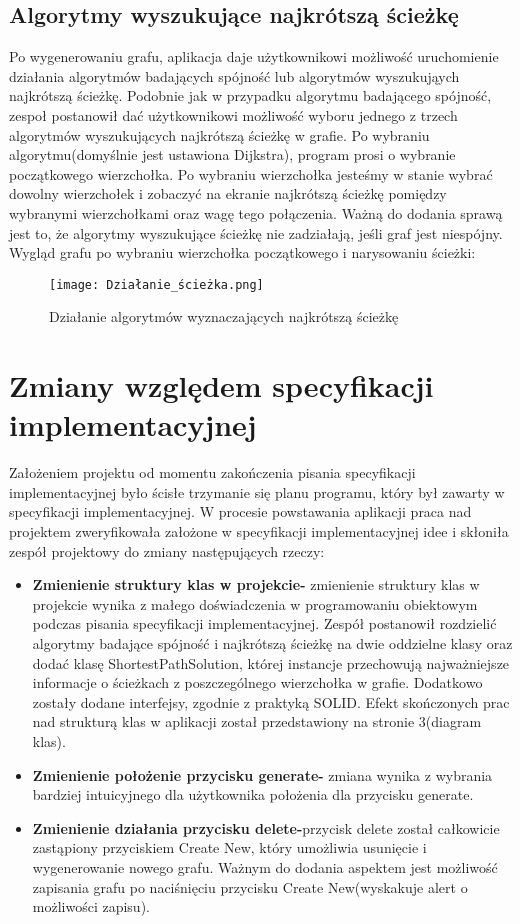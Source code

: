 \documentclass[10pt]{article}
\begin{document}
\subsection{Algorytmy wyszukujące najkrótszą ścieżkę}
Po wygenerowaniu grafu, aplikacja daje użytkownikowi możliwość uruchomienie działania algorytmów badających spójność lub algorytmów wyszukująych najkrótszą ścieżkę. Podobnie jak w przypadku algorytmu badającego spójność, zespoł postanowił dać użytkownikowi możliwość wyboru jednego z  trzech algorytmów wyszukujących najkrótszą ścieżkę w grafie. Po wybraniu algorytmu(domyślnie jest ustawiona Dijkstra), program prosi o wybranie początkowego wierzchołka. Po wybraniu wierzchołka jesteśmy w stanie wybrać dowolny wierzchołek i zobaczyć na ekranie najkrótszą ścieżkę pomiędzy wybranymi wierzchołkami oraz wagę tego połączenia. Ważną do dodania sprawą jest to, że algorytmy wyszukujące ścieżkę nie zadziałają, jeśli graf jest niespójny.\\ Wygląd grafu po wybraniu wierzchołka początkowego i narysowaniu ścieżki:
\begin{figure}[h]
\centering
\texttt{[image: Działanie\_ścieżka.png]}
\caption{Działanie algorytmów wyznaczających najkrótszą ścieżkę}
\end{figure}
\newpage
\section{Zmiany względem specyfikacji implementacyjnej}
Założeniem projektu od momentu zakończenia pisania specyfikacji implementacyjnej było ścisłe trzymanie się planu programu, który był zawarty w specyfikacji implementacyjnej. W procesie powstawania aplikacji praca nad projektem zweryfikowała założone w specyfikacji implementacyjnej idee i skłoniła zespół projektowy do zmiany następujących rzeczy:
\begin{itemize}
    \item \textbf{Zmienienie struktury klas w projekcie-} zmienienie struktury klas w projekcie wynika z małego doświadczenia w programowaniu obiektowym podczas pisania specyfikacji implementacyjnej. Zespół postanowił rozdzielić algorytmy badające spójność i najkrótszą ścieżkę na dwie oddzielne klasy oraz dodać klasę ShortestPathSolution, której instancje przechowują najważniejsze informacje o ścieżkach z poszczególnego wierzchołka w grafie. Dodatkowo zostały dodane interfejsy, zgodnie z praktyką SOLID. Efekt skończonych prac nad strukturą klas w aplikacji został przedstawiony na stronie 3(diagram klas).
    \item \textbf{Zmienienie położenie przycisku generate-} zmiana wynika z wybrania bardziej intuicyjnego dla użytkownika położenia dla przycisku generate.
    \item \textbf{Zmienienie działania przycisku delete-}przycisk delete został całkowicie zastąpiony przyciskiem Create New, który umożliwia usunięcie i wygenerowanie nowego grafu. Ważnym do dodania aspektem jest możliwość zapisania grafu po naciśnięciu przycisku Create New(wyskakuje alert o możliwości zapisu).
\end{itemize}
\newpage
\end{document}
